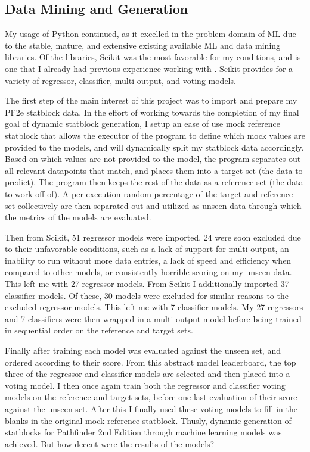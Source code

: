 \documentclass[11pt]{article}
\begin{document}
\subsection{Data Mining and Generation}

My usage of Python continued, as it excelled in the problem domain of ML due to the stable, mature, and extensive existing available ML and data mining libraries. Of the libraries, Scikit \cite{scikit1} was the most favorable for my conditions, and is one that I already had previous experience working with \cite{vess-dev_2022}. Scikit provides for a variety of regressor, classifier, multi-output, and voting models.

The first step of the main interest of this project was to import and prepare my PF2e statblock data. In the effort of working towards the completion of my final goal of dynamic statblock generation, I setup an ease of use mock reference statblock that allows the executor of the program to define which mock values are provided to the models, and will dynamically split my statblock data accordingly. Based on which values are not provided to the model, the program separates out all relevant datapoints that match, and places them into a target set (the data to predict). The program then keeps the rest of the data as a reference set (the data to work off of). A per execution random percentage of the target and reference set collectively are then separated out and utilized as unseen data through which the metrics of the models are evaluated.

Then from Scikit, 51 regressor models were imported. 24 were soon excluded due to their unfavorable conditions, such as a lack of support for multi-output, an inability to run without more data entries, a lack of speed and efficiency when compared to other models, or consistently horrible scoring on my unseen data. This left me with 27 regressor models. From Scikit I additionally imported 37 classifier models. Of these, 30 models were excluded for similar reasons to the excluded regressor models. This left me with 7 classifier models. My 27 regressors and 7 classifiers were then wrapped in a multi-output model before being trained in sequential order on the reference and target sets.

Finally after training each model was evaluated against the unseen set, and ordered according to their score. From this abstract model leaderboard, the top three of the regressor and classifier models are selected and then placed into a voting model. I then once again train both the regressor and classifier voting models on the reference and target sets, before one last evaluation of their score against the unseen set. After this I finally used these voting models to fill in the blanks in the original mock reference statblock. Thusly, dynamic generation of statblocks for Pathfinder 2nd Edition through machine learning models was achieved. But how decent were the results of the models?
\end{document}
